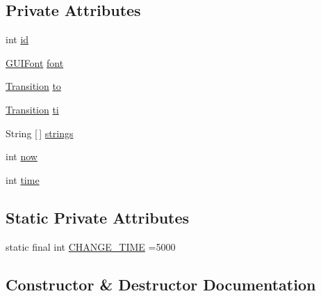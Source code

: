 \subsection*{Private Attributes}
\begin{DoxyCompactItemize}
\item 
int \mbox{\hyperlink{classstates_1_1_final_credits_afdc1fee5ede57fa6fcc6d70025a0b7c5}{id}}
\item 
\mbox{\hyperlink{classgui_1_1_g_u_i_font}{G\+U\+I\+Font}} \mbox{\hyperlink{classstates_1_1_final_credits_a03543cc856cb4e1b2fb064dc86913fbc}{font}}
\item 
\mbox{\hyperlink{interfaceorg_1_1newdawn_1_1slick_1_1state_1_1transition_1_1_transition}{Transition}} \mbox{\hyperlink{classstates_1_1_final_credits_ad16d712e09a7a1691ef0c5c1e8af43a2}{to}}
\item 
\mbox{\hyperlink{interfaceorg_1_1newdawn_1_1slick_1_1state_1_1transition_1_1_transition}{Transition}} \mbox{\hyperlink{classstates_1_1_final_credits_a4fd006baab2595e4e9ffd3ac7ca8998f}{ti}}
\item 
String \mbox{[}$\,$\mbox{]} \mbox{\hyperlink{classstates_1_1_final_credits_aa72712a2592f1b5e7025dc65bf28c43d}{strings}}
\item 
int \mbox{\hyperlink{classstates_1_1_final_credits_aecf9d8b376badec5eed9ad03986ec8c3}{now}}
\item 
int \mbox{\hyperlink{classstates_1_1_final_credits_a982b8c49cb19952faa0cd28aedea2e28}{time}}
\end{DoxyCompactItemize}
\subsection*{Static Private Attributes}
\begin{DoxyCompactItemize}
\item 
static final int \mbox{\hyperlink{classstates_1_1_final_credits_a111fac3fed4b39752db6f751018aac08}{C\+H\+A\+N\+G\+E\+\_\+\+T\+I\+ME}} =5000
\end{DoxyCompactItemize}


\subsection{Constructor \& Destructor Documentation}
\mbox{\label{classstates_1_1_final_credits_a2696358b5ac79f9385759c4a217b0bd0}} 
